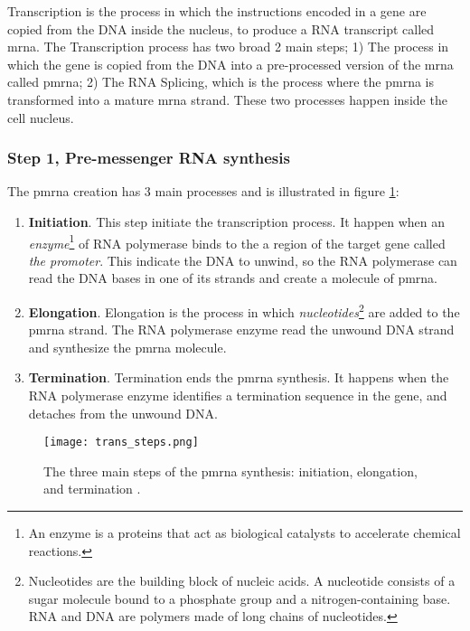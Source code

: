 \graphicspath{{./Sections/Basics/Resources/}}

Transcription is the process in which the instructions encoded in a gene are copied from the DNA inside the nucleus, to produce a RNA transcript called \acrlong{mrna}. The Transcription process has two broad 2 main steps; 1) The process in which the gene is copied from the DNA into a pre-processed version of the \gls{mrna} called \gls{pmrna}; 2) The RNA Splicing, which is the process where the \gls{pmrna} is transformed into a mature \gls{mrna} strand. These two processes happen inside the cell nucleus.

\subsubsection{Step 1, Pre-messenger RNA synthesis}
The \gls{pmrna} creation has 3 main processes\cite{MolecularWatson} and is illustrated in figure \ref{fig:BB:premrna_synth}:

\begin{enumerate}
  \item \textbf{Initiation}. This step initiate the transcription process. It happen when an \textit{enzyme}\footnote{An enzyme is a proteins that act as biological catalysts to accelerate chemical reactions.} of RNA polymerase binds to the a region of the target gene called \textit{the promoter}. This indicate the DNA to unwind, so the RNA polymerase can read the DNA bases in one of its strands and create a molecule of \gls{pmrna}.
  \item \textbf{Elongation}. Elongation is the process in which \textit{nucleotides}\footnote{Nucleotides are the building block of nucleic acids. A nucleotide consists of a sugar molecule bound to a phosphate group and a nitrogen-containing base. RNA and DNA are polymers made of long chains of nucleotides.} are added to the \gls{pmrna} strand. The RNA polymerase enzyme read the unwound DNA strand and synthesize the \gls{pmrna} molecule.
  \item \textbf{Termination}. Termination ends the \gls{pmrna} synthesis. It happens when the RNA polymerase enzyme identifies a termination sequence in the gene, and detaches from the unwound DNA.
\end{enumerate}

\begin{figure}[htb]
  \centering
  \texttt{[image: trans\_steps.png]}
  \caption{The three main steps of the \gls{pmrna} synthesis: initiation, elongation, and termination \cite{transcription_steps}.}
  \label{fig:BB:premrna_synth}
\end{figure}

